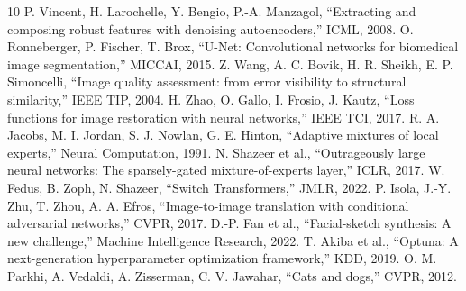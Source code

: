 \documentclass[conference]{IEEEtran}
\begin{document}
\begin{thebibliography}{10}
 P. Vincent, H. Larochelle, Y. Bengio, P.-A. Manzagol, ``Extracting and composing robust features with denoising autoencoders,'' ICML, 2008.
 O. Ronneberger, P. Fischer, T. Brox, ``U-Net: Convolutional networks for biomedical image segmentation,'' MICCAI, 2015.
 Z. Wang, A. C. Bovik, H. R. Sheikh, E. P. Simoncelli, ``Image quality assessment: from error visibility to structural similarity,'' IEEE TIP, 2004.
 H. Zhao, O. Gallo, I. Frosio, J. Kautz, ``Loss functions for image restoration with neural networks,'' IEEE TCI, 2017.
 R. A. Jacobs, M. I. Jordan, S. J. Nowlan, G. E. Hinton, ``Adaptive mixtures of local experts,'' Neural Computation, 1991.
 N. Shazeer et al., ``Outrageously large neural networks: The sparsely-gated mixture-of-experts layer,'' ICLR, 2017.
 W. Fedus, B. Zoph, N. Shazeer, ``Switch Transformers,'' JMLR, 2022.
 P. Isola, J.-Y. Zhu, T. Zhou, A. A. Efros, ``Image-to-image translation with conditional adversarial networks,'' CVPR, 2017.
 D.-P. Fan et al., ``Facial-sketch synthesis: A new challenge,'' Machine Intelligence Research, 2022.
 T. Akiba et al., ``Optuna: A next-generation hyperparameter optimization framework,'' KDD, 2019.
 O. M. Parkhi, A. Vedaldi, A. Zisserman, C. V. Jawahar, ``Cats and dogs,'' CVPR, 2012.
\end{thebibliography}
\end{document}
